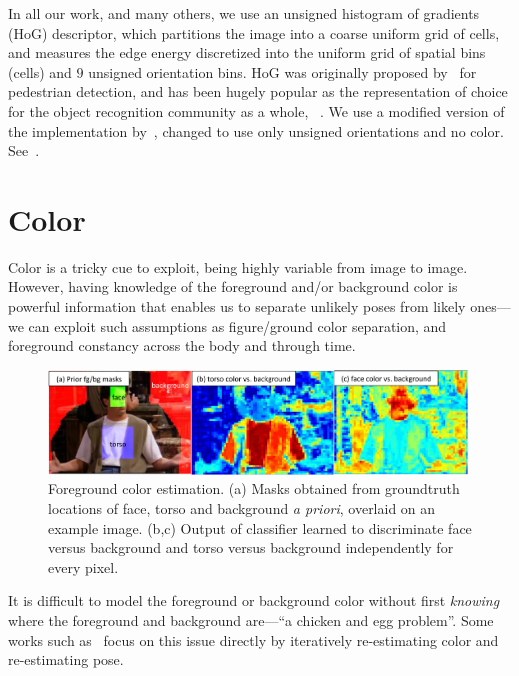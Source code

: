 In all our work, and many others, we use an unsigned histogram of gradients 
(HoG) descriptor, which partitions the image into a coarse uniform grid of 
cells, and measures the edge energy discretized into the uniform grid of 
spatial bins (cells) and $9$ unsigned orientation bins.  HoG was originally 
proposed by~\citet{dalal-triggs} for pedestrian detection, and has been hugely 
popular as the representation of choice for the object recognition community as 
a whole, \eg~\cite{pff-dpm}.  We use a modified version of the implementation 
by~\citet{pff-dpm}, changed to use only unsigned orientations and no color.  
See~.

\section{Color}\label{sec:color}
Color is a tricky cue to exploit, being highly variable from image to image.  
However, having knowledge of the foreground and/or background color is powerful 
information that enables us to separate unlikely poses from likely ones---we 
can exploit such assumptions as figure/ground color separation, and foreground 
constancy across the body and through time. 

\begin{figure}[tb]
\begin{center}
\includegraphics[width=0.99\textwidth]{figs/fg-color.pdf}
\caption[Foreground color estimation.]{Foreground color estimation.  (a) Masks 
obtained from groundtruth locations of face, torso and background {\em a 
priori}, overlaid on an example image. (b,c) Output of classifier learned to 
discriminate face versus background and torso versus background independently 
for every pixel. }
\label{fig:fg-color}
\end{center}
\end{figure}



It is difficult to model the foreground or background color without first {\em 
knowing} where the foreground and background are---``a chicken and egg 
problem''.  Some works such as~\citep{devacrf,eichner09} focus on this issue 
directly by iteratively re-estimating color and re-estimating pose.  

